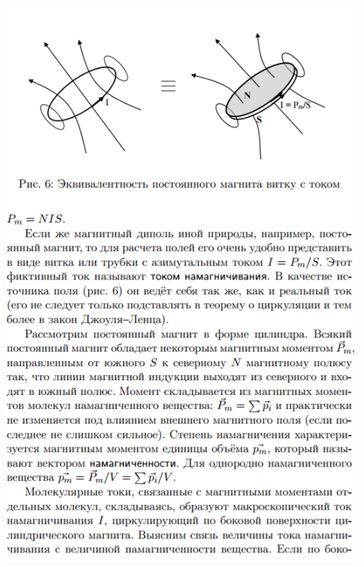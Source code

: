 \documentclass[12pt]{article}
\begin{document}
\begin{center}
	    \includegraphics[width=15cm]{theory8.png}

\end{center}
\end{document}
